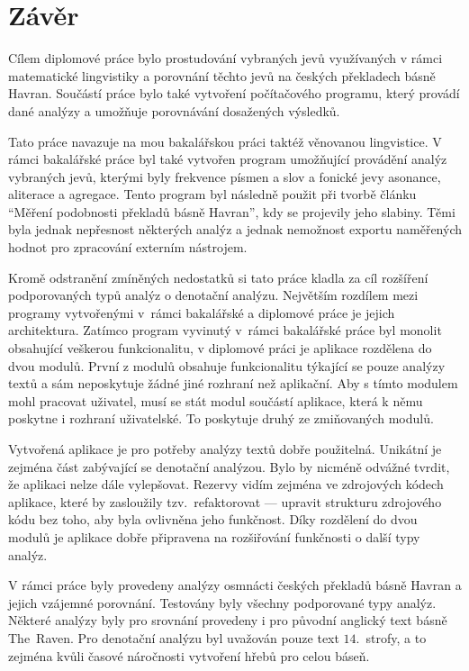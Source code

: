 \documentclass[dp.tex]{subfiles}
\begin{document}
\chapter*{Závěr}
\label{chap:zaver} 

Cílem diplomové práce bylo prostudování vybraných jevů využívaných v rámci matematické lingvistiky a porovnání těchto jevů na českých překladech básně Havran. Součástí práce bylo také vytvoření počítačového programu, který provádí dané analýzy a umožňuje porovnávání dosažených výsledků.

Tato práce navazuje na mou bakalářskou práci taktéž věnovanou lingvistice. V rámci bakalářské práce byl také vytvořen program umožňující provádění analýz vybraných jevů, kterými byly frekvence písmen a slov a fonické jevy asonance, aliterace a agregace. Tento program byl následně použit při tvorbě článku \enquote{Měření podobnosti překladů básně Havran}, kdy se projevily jeho slabiny. Těmi byla jednak nepřesnost některých analýz a jednak nemožnost exportu naměřených hodnot pro zpracování externím nástrojem.

Kromě odstranění zmíněných nedostatků si tato práce kladla za cíl rozšíření podporovaných typů analýz o denotační analýzu. Největším rozdílem mezi programy vytvořenými v~rámci bakalářské a diplomové práce je jejich architektura. Zatímco program vyvinutý v~rámci bakalářské práce byl monolit obsahující veškerou funkcionalitu, v diplomové práci je aplikace rozdělena do dvou modulů. První z modulů obsahuje funkcionalitu týkající se pouze analýzy textů a sám neposkytuje žádné jiné rozhraní než aplikační. Aby s tímto modulem mohl pracovat uživatel, musí se stát modul součástí aplikace, která k němu poskytne i rozhraní uživatelské. To poskytuje druhý ze zmiňovaných modulů.

Vytvořená aplikace je pro potřeby analýzy textů dobře použitelná. Unikátní je zejména část zabývající se denotační analýzou. Bylo by nicméně odvážné tvrdit, že aplikaci nelze dále \mbox{vylepšovat}. Rezervy vidím zejména ve zdrojových kódech aplikace, které by zasloužily tzv.~refaktorovat --- upravit strukturu zdrojového kódu bez toho, aby byla ovlivněna jeho funkčnost. Díky rozdělení do dvou modulů je aplikace dobře připravena na rozšiřování funkčnosti o další typy analýz.

V rámci práce byly provedeny analýzy osmnácti českých překladů básně Havran a jejich vzájemné porovnání. Testovány byly všechny podporované typy analýz. Některé analýzy byly pro srovnání provedeny i pro původní anglický text básně The~Raven. Pro denotační analýzu byl uvažován pouze text $14.$~strofy, a to zejména kvůli časové náročnosti vytvoření hřebů pro celou báseň.
\end{document}
